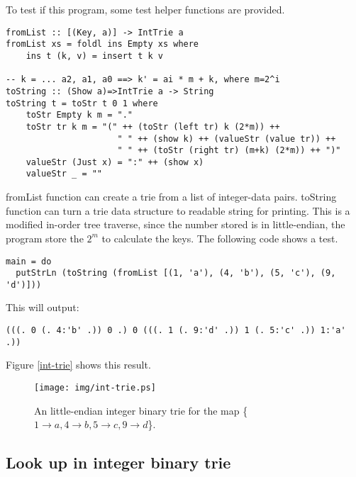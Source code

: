 \documentclass{article}
\begin{document}
To test if this program, some test helper functions are provided.

\begin{lstlisting}
fromList :: [(Key, a)] -> IntTrie a
fromList xs = foldl ins Empty xs where
    ins t (k, v) = insert t k v

-- k = ... a2, a1, a0 ==> k' = ai * m + k, where m=2^i
toString :: (Show a)=>IntTrie a -> String
toString t = toStr t 0 1 where
    toStr Empty k m = "."
    toStr tr k m = "(" ++ (toStr (left tr) k (2*m)) ++
                      " " ++ (show k) ++ (valueStr (value tr)) ++
                      " " ++ (toStr (right tr) (m+k) (2*m)) ++ ")"
    valueStr (Just x) = ":" ++ (show x)
    valueStr _ = ""
\end{lstlisting}

fromList function can create a trie from a list of integer-data pairs.
toString function can turn a trie data structure to readable string
for printing. This is a modified in-order tree traverse, since the number
stored is in little-endian, the program store the $2^m$ to calculate
the keys. The following code shows a test.

\begin{lstlisting}
main = do
  putStrLn (toString (fromList [(1, 'a'), (4, 'b'), (5, 'c'), (9, 'd')]))
\end{lstlisting}

This will output:
\begin{verbatim}
(((. 0 (. 4:'b' .)) 0 .) 0 (((. 1 (. 9:'d' .)) 1 (. 5:'c' .)) 1:'a' .))
\end{verbatim}

Figure \ref{int-trie} shows this result. 
\begin{figure}[htbp]
       \begin{center}
	\texttt{[image: img/int-trie.ps]}
        \caption{An little-endian integer binary trie for the map 
          \{$ 1 \rightarrow a, 4 \rightarrow b, 5 \rightarrow c, 9 \rightarrow d$\}.} 
        \label{fig:int-trie}
       \end{center}
\end{figure}


\subsection{Look up in integer binary trie} 
\end{document}
